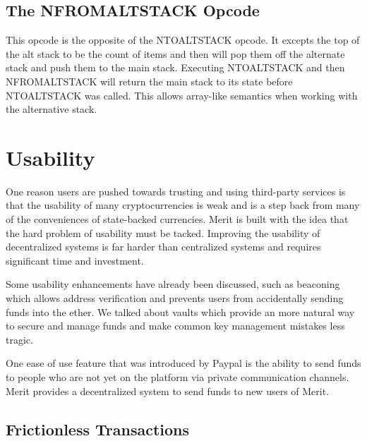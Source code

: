 \documentclass{article}
\begin{document}
\subsection{The NFROMALTSTACK Opcode}

\begin{center}
\end{center}

This opcode is the opposite of the NTOALTSTACK opcode.  It excepts the top of the
alt stack to be the count of items and then will pop them off the alternate stack
and push them to the main stack.  Executing NTOALTSTACK and then NFROMALTSTACK will
return the main stack to its state before NTOALTSTACK was called.  This allows
array-like semantics when working with the alternative stack.

\section{Usability}

One reason users are pushed towards trusting and using third-party services is that
the usability of many cryptocurrencies is weak and is a step back from many
of the conveniences of state-backed currencies.  Merit is built with the idea
that the hard problem of usability must be tacked.  Improving the usability of
decentralized systems is far harder than centralized systems and requires significant
time and investment.

Some usability enhancements have already been discussed, such as beaconing which
allows address verification and prevents users from accidentally sending funds into
the ether.  We talked about vaults which provide an more natural way to secure and
manage funds and make common key management mistakes less tragic.

One ease of use feature that was introduced by Paypal is the ability to send
funds to people who are not yet on the platform via private communication channels.
Merit provides a decentralized system to send funds to new users of Merit.

\subsection{Frictionless Transactions}
\end{document}
